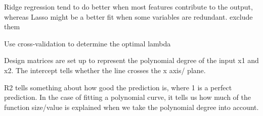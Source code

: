 Ridge regression tend to do better when most features contribute to the output, whereas Lasso might be a better fit when some variables are redundant. exclude them

Use cross-validation to determine the optimal lambda

Design matrices are set up to represent the polynomial degree of the input x1 and x2. The intercept tells whether the line crosses the x axis/ plane.

R2 tells something about how good the prediction is, where 1 is a perfect prediction. In the case of fitting a polynomial curve, it tells us how much of the function size/value is explained when we take the polynomial degree into account.

